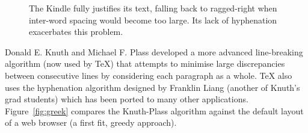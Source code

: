 \begin{figure}
    \centering
    \caption[Poor typography on the Kindle]{The Kindle fully justifies its text, falling back to ragged-right when inter-word spacing would become too large. Its lack of hyphenation exacerbates this problem.}
    \label{fig:crapkindle}
\end{figure}

Donald E. Knuth and Michael F. Plass\cite{Knuth1981} developed a more advanced line-breaking algorithm (now used by \TeX{}) that attempts to minimise large discrepancies between consecutive lines by considering each paragraph as a whole. \TeX{} also uses the hyphenation algorithm designed by Franklin Liang\cite{Liang1983} (another of Knuth's grad students) which has been ported to many other applications. Figure~\ref{fig:greek} compares the Knuth-Plass algorithm against the default layout of a web browser (a first fit, greedy approach).


